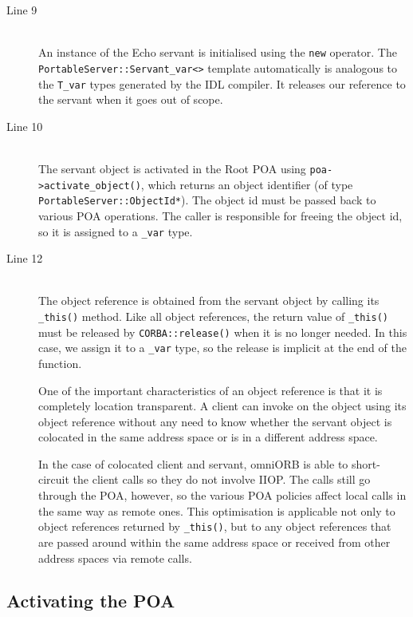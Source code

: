 \documentclass[11pt,twoside,a4paper]{book}
\newcommand{\type}[1]{\texttt{#1}}
\newcommand{\code}[1]{\texttt{#1}}
\newcommand{\op}[1]{\texttt{#1()}}
\newcommand{\dsc}{\discretionary{}{}{}}
\begin{document}
\begin{description}

\item[Line 9]\mbox{}\\
%
An instance of the Echo servant is initialised using the \code{new}
operator. The \type{PortableServer::Servant\_var<>} template
automatically is analogous to the \type{T\_var} types generated by the
IDL compiler. It releases our reference to the servant when it goes
out of scope.

\item[Line 10]\mbox{}\\
%
The servant object is activated in the Root POA using
\op{poa->activate\_\dsc{}object}, which returns an object identifier
(of type \type{PortableServer::\dsc{}ObjectId*}). The object id must
be passed back to various POA operations. The caller is responsible
for freeing the object id, so it is assigned to a \type{\_var} type.

\item[Line 12]\mbox{}\\
%
The object reference is obtained from the servant object by calling
its \op{\_this} method. Like all object references, the return value
of \op{\_this} must be released by \op{CORBA::release} when it is no
longer needed. In this case, we assign it to a \type{\_var} type, so
the release is implicit at the end of the function.

One of the important characteristics of an object reference is that it
is completely location transparent. A client can invoke on the object
using its object reference without any need to know whether the
servant object is colocated in the same address space or is in a
different address space.

In the case of colocated client and servant, omniORB is able to
short-circuit the client calls so they do not involve IIOP. The calls
still go through the POA, however, so the various POA policies affect
local calls in the same way as remote ones. This optimisation is
applicable not only to object references returned by \op{\_this}, but
to any object references that are passed around within the same
address space or received from other address spaces via remote calls.

\end{description}


\subsection{Activating the POA}
\end{document}
